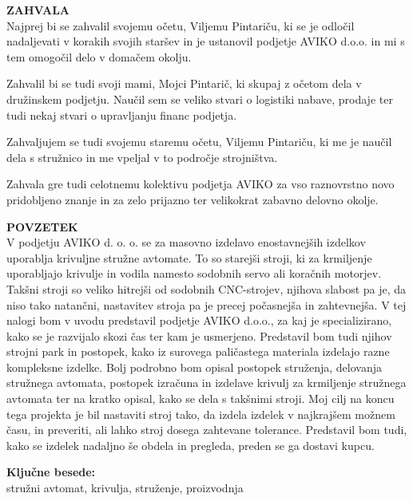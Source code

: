 \newpage
\textbf{\fontsize{14}{21}\selectfont ZAHVALA} \\
Najprej bi se zahvalil svojemu očetu, Viljemu Pintariču,
ki se je odločil nadaljevati v korakih svojih staršev in 
je ustanovil podjetje AVIKO d.o.o. in mi s tem omogočil delo
v domačem okolju.

Zahvalil bi se tudi svoji mami, Mojci Pintarič, ki skupaj z očetom
dela v družinskem podjetju. Naučil sem se veliko stvari o 
logistiki nabave, prodaje ter tudi nekaj stvari o upravljanju
financ podjetja.

Zahvaljujem se tudi svojemu staremu očetu, Viljemu Pintariču,
ki me je naučil dela s stružnico in me vpeljal v to področje strojništva.

Zahvala gre tudi celotnemu kolektivu podjetja AVIKO za vso
raznovrstno novo pridobljeno znanje in za zelo prijazno ter velikokrat
zabavno delovno okolje.

\newpage
\textbf{\fontsize{14}{21}\selectfont POVZETEK} \\
V podjetju AVIKO d. o. o. se za masovno izdelavo enostavnejših 
izdelkov uporablja krivuljne stružne avtomate. To so starejši 
stroji, ki za krmiljenje uporabljajo krivulje in vodila namesto 
sodobnih servo ali koračnih motorjev. Takšni stroji so veliko 
hitrejši od sodobnih CNC-strojev, njihova slabost pa je, da niso 
tako natančni, nastavitev stroja pa je precej počasnejša in zahtevnejša.
V tej nalogi bom v uvodu predstavil podjetje AVIKO d.o.o., 
za kaj je specializirano, kako se je razvijalo skozi 
čas ter kam je usmerjeno. Predstavil bom tudi njihov strojni 
park in postopek, kako iz surovega paličastega materiala 
izdelajo razne kompleksne izdelke.
Bolj podrobno bom opisal postopek struženja, delovanja
stružnega avtomata, postopek
izračuna in izdelave krivulj za krmiljenje stružnega avtomata ter na kratko opisal, kako se dela s takšnimi stroji.
Moj cilj na koncu tega projekta je bil
nastaviti stroj tako, da izdela 
izdelek v najkrajšem možnem času, in preveriti, ali lahko stroj
dosega zahtevane tolerance. Predstavil bom tudi, kako se
izdelek nadaljno še obdela in pregleda, preden se ga dostavi kupcu.

\textbf{\fontsize{14}{21}\selectfont Ključne besede:} \\
\fontsize{12}{16}stružni avtomat, krivulja, struženje, proizvodnja

